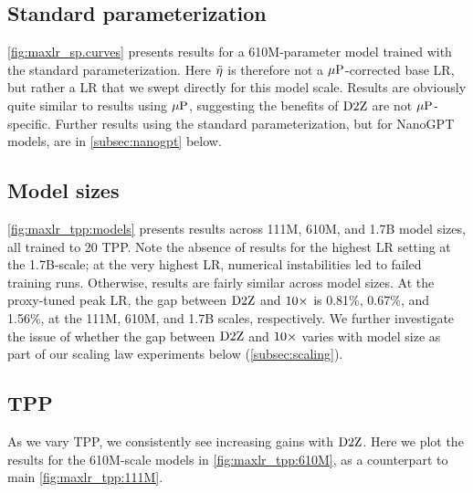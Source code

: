 \subsection{Standard parameterization}\label{subsec:sp}




\cref{fig:maxlr_sp.curves} presents results for a 610M-parameter
model trained with the standard parameterization.  Here $\tilde{\eta}$ is
therefore not a $\mbox{$\mu$P}$-corrected base LR, but rather a LR that we
swept directly for this model scale.
%
Results are obviously quite similar to results using $\mbox{$\mu$P}$,
suggesting the benefits of $\mbox{D2Z}$ are not $\mbox{$\mu$P}$-specific.  Further
results using the standard parameterization, but for NanoGPT models,
are in \cref{subsec:nanogpt} below.

\subsection{Model sizes}\label{subsec:model_sizes}




\cref{fig:maxlr_tpp:models} presents results across 111M, 610M,
and 1.7B model sizes, all trained to 20 TPP\@.  Note the absence of
results for the highest LR setting at the 1.7B-scale; at the very
highest LR, numerical instabilities led to failed training runs.
Otherwise, results are fairly similar across model sizes.  At the
proxy-tuned peak LR, the gap between $\mbox{D2Z}$ and $\mbox{10}\times$ is 0.81\%,
0.67\%, and 1.56\%, at the 111M, 610M, and 1.7B scales, respectively.
We further investigate the issue of whether the gap between $\mbox{D2Z}$
and $\mbox{10}\times$ varies with model size as part of our scaling law
experiments below (\cref{subsec:scaling}).

\subsection{TPP}\label{subsec:tpp}




As we vary TPP, we consistently see increasing gains with $\mbox{D2Z}$.
Here we plot the results for the 610M-scale models in
\cref{fig:maxlr_tpp:610M}, as a counterpart to main
\cref{fig:maxlr_tpp:111M}.

